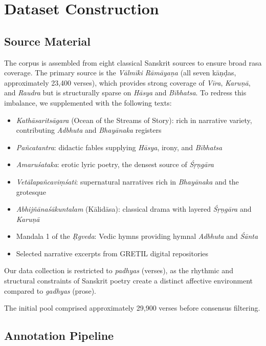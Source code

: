 \documentclass[11pt]{article}
\begin{document}
\section{Dataset Construction}

\subsection{Source Material}

The corpus is assembled from eight classical Sanskrit sources to ensure broad rasa coverage. The primary source is the \textit{V\=alm\=iki R\=am\=aya\d na} (all seven k\=a\d n\d das, approximately 23,400 verses), which provides strong coverage of \textit{V\=ira}, \textit{Karu\d n\=a}, and \textit{Raudra} but is structurally sparse on \textit{H\=asya} and \textit{B\=ibhatsa}. To redress this imbalance, we supplemented with the following texts:

\begin{itemize}
    \item \textit{Kath\=asarits\=agara} (Ocean of the Streams of Story): rich in narrative variety, contributing \textit{Adbhuta} and \textit{Bhay\=anaka} registers
    \item \textit{Pa\~ncatantra}: didactic fables supplying \textit{H\=asya}, irony, and \textit{B\=ibhatsa}
    \item \textit{Amaru\'{s}ataka}: erotic lyric poetry, the densest source of \textit{Ś\d r\d ng\=ara}
    \item \textit{Vet\=alapañcavi\d m\'{s}ati}: supernatural narratives rich in \textit{Bhay\=anaka} and the grotesque
    \item \textit{Abhij\~n\=anaś\=akuntalam} (K\=alid\=asa): classical drama with layered \textit{Ś\d r\d ng\=ara} and \textit{Karu\d n\=a}
    \item Mandala 1 of the \textit{\d Rgveda}: Vedic hymns providing hymnal \textit{Adbhuta} and \textit{Ś\=anta}
    \item Selected narrative excerpts from GRETIL digital repositories
\end{itemize}
Our data collection is restricted to \textit{padhyas} (verses), as the rhythmic and structural constraints of Sanskrit poetry create a distinct affective environment compared to \textit{gadhyas} (prose).

The initial pool comprised approximately 29,900 verses before consensus filtering.

\subsection{Annotation Pipeline}
\end{document}

